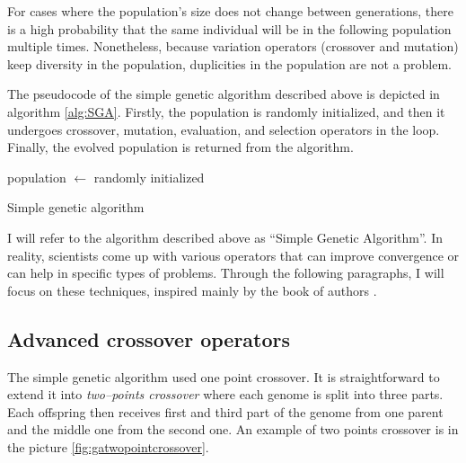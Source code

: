 For cases where the population's size does not change between generations, there is a high probability that the same individual will be in the following population multiple times. Nonetheless, because variation operators (crossover and mutation) keep diversity in the population, duplicities in the population are not a problem.

The pseudocode of the simple genetic algorithm described above is depicted in algorithm \ref{alg:SGA}. Firstly, the population is randomly initialized, and then it undergoes crossover, mutation, evaluation, and selection operators in the loop. Finally, the evolved population is returned from the algorithm.

\begin{algorithm}
    population $\leftarrow$ randomly initialized\;
    \caption{Simple genetic algorithm}
    \label{alg:SGA}
\end{algorithm}

I will refer to the algorithm described above as \enquote{Simple Genetic Algorithm}. In reality, scientists come up with various operators that can improve convergence or can help in specific types of problems. Through the following paragraphs, I will focus on these techniques, inspired mainly by the book of authors \citet*{IntroToGA}.

\subsection{Advanced crossover operators}

The simple genetic algorithm used one point crossover. It is straightforward to extend it into \emph{two--points crossover} where each genome is split into three parts. Each offspring then receives first and third part of the genome from one parent and the middle one from the second one. An example of two points crossover is in the picture \ref{fig:gatwopointcrossover}.

